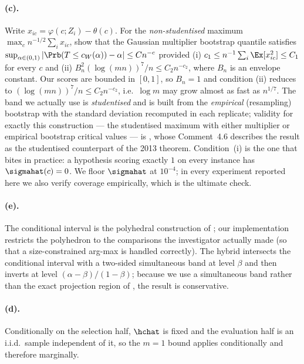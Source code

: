 \paragraph{(c).} Write $x_{ic}=\varphi(c;Z_i)-\theta(c)$. For the
\emph{non-studentised} maximum $\max_c n^{-1/2}\sum_i x_{ic}$,
\citet[Thm.~3.2 and Cor.~3.1]{chernozhukov2013gaussian} show that the Gaussian
multiplier bootstrap quantile satisfies
$\sup_{\alpha\in(0,1)}|\Prb(T\le c_W(\alpha))-\alpha|\le Cn^{-c}$ provided
(i) $c_1\le n^{-1}\sum_i\Ex[x_{ic}^2]\le C_1$ for every $c$ and
(ii) $B_n^2(\log(mn))^7/n\le C_2 n^{-c_2}$, where $B_n$ is an envelope constant.
Our scores are bounded in $[0,1]$, so $B_n=1$ and condition (ii) reduces to
$(\log(mn))^7/n\le C_2n^{-c_2}$, i.e.\ $\log m$ may grow almost as fast as
$n^{1/7}$. The band we actually use is \emph{studentised} and is built from the
\emph{empirical} (resampling) bootstrap with the standard deviation recomputed
in each replicate; validity for exactly this construction --- the studentised
maximum with either multiplier or empirical bootstrap critical values --- is
\citet[Thm.~4.3, ``Validity of one-step MB and EB methods'']{cck2019moment},
whose Comment~4.6 describes the result as the studentised counterpart of the
2013 theorem. Condition~(i) is the one that
bites in practice: a hypothesis scoring exactly $1$ on every instance has
$\sigmahat(c)=0$. We floor $\sigmahat$ at $10^{-4}$; in every experiment reported
here we also verify coverage empirically, which is the ultimate check.

\paragraph{(e).} The conditional interval is the polyhedral construction of
\citet{lee2016exact}; our implementation restricts the polyhedron to the
comparisons the investigator actually made (so that a size-constrained arg-max is
handled correctly). The hybrid intersects the conditional interval with a
two-sided simultaneous band at level $\beta$ and then inverts at level
$(\alpha-\beta)/(1-\beta)$; because we use a simultaneous band rather than the
exact projection region of \citet{andrews2024inference}, the result is
conservative.

\paragraph{(d).} Conditionally on the selection half, $\hchat$ is fixed and the
evaluation half is an i.i.d.\ sample independent of it, so the $m=1$ bound
applies conditionally and therefore marginally.

